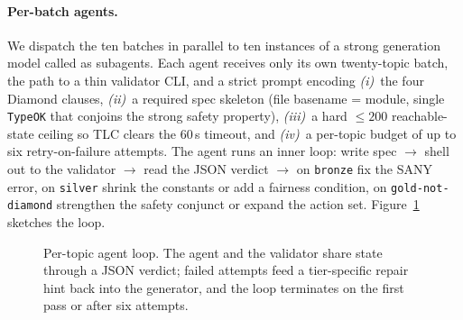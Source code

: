 \documentclass[11pt]{article}
\begin{document}
\paragraph{Per-batch agents.} We dispatch the ten batches in parallel to
ten instances of a strong generation model called as subagents. Each
agent receives only its own twenty-topic batch, the path to a thin
validator CLI, and a strict prompt encoding \emph{(i)}~the four Diamond
clauses, \emph{(ii)}~a required spec skeleton (file basename = module,
single \texttt{TypeOK} that conjoins the strong safety property),
\emph{(iii)}~a hard $\le\!200$ reachable-state ceiling so TLC clears the
$60$\,s timeout, and \emph{(iv)}~a per-topic budget of up to six
retry-on-failure attempts. The agent runs an inner loop: write spec
$\to$ shell out to the validator $\to$ read the JSON verdict $\to$ on
\texttt{bronze} fix the SANY error, on \texttt{silver} shrink the
constants or add a fairness condition, on \texttt{gold-not-diamond}
strengthen the safety conjunct or expand the action set.
Figure~\ref{fig:agent-loop} sketches the loop.

\begin{figure}[t]
\centering
{}
\caption{Per-topic agent loop. The agent and the validator share state
through a JSON verdict; failed attempts feed a tier-specific repair hint
back into the generator, and the loop terminates on the first pass or
after six attempts.}
\label{fig:agent-loop}
\end{figure}
\end{document}

